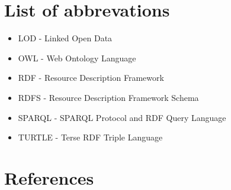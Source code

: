 \documentclass[12pt, a4paper]{report}
\begin{document}


\setcounter{page}{0}



\chapter*{List of abbrevations}

\begin{itemize}
    \item[ ] LOD - Linked Open Data
    \item[ ] OWL - Web Ontology Language
    \item[ ] RDF - Resource Description Framework
    \item[ ] RDFS - Resource Description Framework Schema
    \item[ ] SPARQL - SPARQL Protocol and RDF Query Language
    \item[ ] TURTLE - Terse RDF Triple Language

\end{itemize}

\newpage

\listoffigures

\newpage

\tableofcontents
\cleardoublepage

\setcounter{page}{0}
\clearpage








\chapter*{References}
\printbibliography[heading=none]


\end{document}
